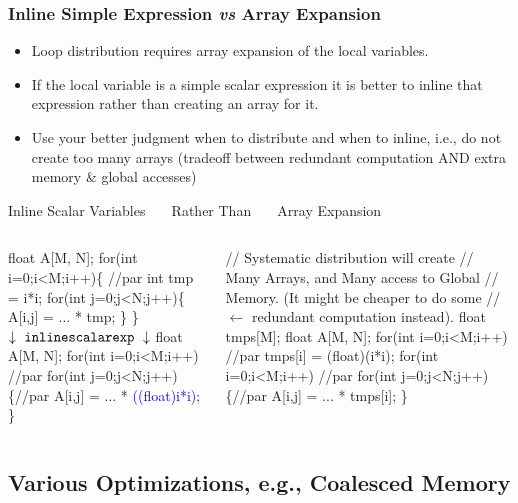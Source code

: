\documentclass{beamer}
\newcommand{\blue}[1]{\textcolor{Blue}{{#1}}}
\newcommand{\emp}[1]{\textcolor{DikuRed}{ #1}}
\newcommand{\emphh}[1]{\textcolor{CosGreen}{ #1}}
\newcommand{\mymath}[1]{$ #1 $}
\begin{document}
\begin{frame}[fragile,t]
  \frametitle{Inline Simple Expression {\em vs} Array Expansion} %


\begin{itemize}
\item Loop distribution requires array expansion of the local variables.\smallskip

\item If the local variable is a simple scalar expression it is
            better to inline that expression rather than creating an array
            for it.\smallskip
\item Use your better judgment when to distribute and when to inline, 
            i.e., do not create too many arrays
            (tradeoff between redundant computation AND extra memory \& global accesses)
\end{itemize}

\begin{block}{Inline Scalar Variables {\tt~~~}Rather Than{\tt~~~} Array Expansion}
\begin{columns}
\vspace{-2ex}
\begin{colorcode}
\emphh{float A[M, N];}
\emphh{for(int i=0;i<M;i++)\{ //par}
  \emp{int tmp = i*i;}
  for(int j=0;j<N;j++)\{
    A[i,j] = ... * tmp;
  \}
\}  \mymath{\downarrow \ {\tt inline scalar exp} \ \downarrow}
float A[M, N];
\emphh{for(int i=0;i<M;i++) //par}
  \emphh{for(int j=0;j<N;j++)\{//par}
    A[i,j] = ... * \blue{((float)i*i)};
  \}
\end{colorcode}
\vspace{-2ex}
\begin{colorcode}
// Systematic distribution will create
// Many Arrays, and Many access to Global 
// Memory. (It might be cheaper to do some 
// \mymath{\leftarrow} redundant computation instead).
\emp{float tmps[M];}
float A[M, N];
\emphh{for(int i=0;i<M;i++) //par}
  \emp{tmps[i]} = (float)(i*i);
\emphh{for(int i=0;i<M;i++) //par}
  \emphh{for(int j=0;j<N;j++)\{//par}
    A[i,j] = ... * \emp{tmps[i]};
  \}
\end{colorcode}
\end{columns}
\end{block} 

\end{frame}


\subsection{Various Optimizations, e.g., Coalesced Memory}
\end{document}
